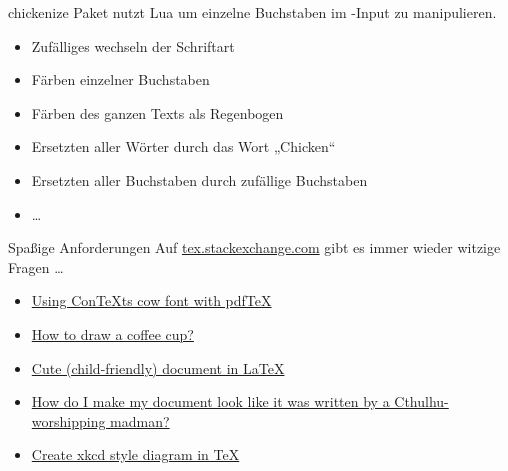 \documentclass[
	vorläufig=true,
	datum=2016-12-22,
	titel={Witziges und Obskures},
	web=false,
]{../tex/latexkurs-slides}
\begin{document}
\begin{frame}[t]{chickenize}
	Paket  nutzt Lua um einzelne Buchstaben im -Input zu manipulieren.
	
	\begin{itemize}
		\item Zufälliges wechseln der Schriftart
		\item Färben einzelner Buchstaben
		\item Färben des ganzen Texts als Regenbogen
		\item Ersetzten aller Wörter durch das Wort „Chicken“
		\item Ersetzten aller Buchstaben durch zufällige Buchstaben
		\item …
	\end{itemize}
\end{frame}

\begin{frame}{Spaßige Anforderungen}
	Auf \url{tex.stackexchange.com} gibt es immer wieder witzige Fragen …
	\begin{itemize}
		\item \href{http://tex.stackexchange.com/questions/115471/using-contexts-cow-font-with-pdftex}{Using ConTeXts cow font with pdfTeX}
		\item \href{http://tex.stackexchange.com/questions/145223/how-to-draw-a-coffee-cup}{How to draw a coffee cup?}
		\item \href{http://tex.stackexchange.com/questions/63732/cute-child-friendly-document-in-latex}{Cute (child-friendly) document in LaTeX}
		\item \href{http://tex.stackexchange.com/questions/29402/how-do-i-make-my-document-look-like-it-was-written-by-a-cthulhu-worshipping-madm}{How do I make my document look like it was written by a Cthulhu-worshipping madman?}
		\item \href{http://tex.stackexchange.com/questions/74878/create-xkcd-style-diagram-in-tex}{Create xkcd style diagram in TeX}
	\end{itemize}
\end{frame}
\end{document}
